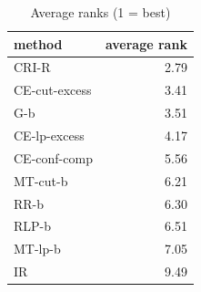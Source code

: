 \begin{table}[htbp]
\centering
\small
\caption{Average ranks (1 = best)}
\label{tab:E2b_head_to_head_budgets_b1_ranks}
\begin{tabular}{lr}
\toprule
method & average rank \\
\midrule
CRI-R & 2.79 \\
CE-cut-excess & 3.41 \\
G-b & 3.51 \\
CE-lp-excess & 4.17 \\
CE-conf-comp & 5.56 \\
MT-cut-b & 6.21 \\
RR-b & 6.30 \\
RLP-b & 6.51 \\
MT-lp-b & 7.05 \\
IR & 9.49 \\
\bottomrule
\end{tabular}
\end{table}
